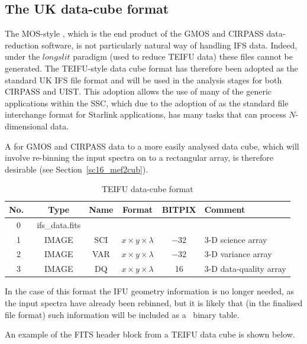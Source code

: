 \documentclass[twoside,11pt]{starlink}
\providecommand{\FITSref}{\htmladdnormallink{FITS}{http://fits.gsfc.nasa.gov/}}
\begin{document}
\subsection{The UK data-cube format\label{sc16_teifufile}}

The MOS-style , which is the end
product of the GMOS and CIRPASS data-reduction software, is not
particularly natural way of handling IFS data.  Indeed, under the
$longslit$ paradigm (used to reduce TEIFU data) these files cannot be
generated.  The TEIFU-style data cube format has therefore been
adopted as the standard UK IFS file format and will be used in the
analysis stages for both CIRPASS and UIST.  This adoption allows the
use of many of the generic applications within the SSC, which due to
the adoption of  as the standard file interchange
format for Starlink applications, has many tasks that can process
$N$-dimensional data.

A  for GMOS and CIRPASS data
to a more easily analysed data cube, which will involve re-binning the
input spectra on to a rectangular array, is therefore
desirable (see Section~\ref{sc16_mef2cub}).

\begin{table}[h]
\begin{center}
\begin{tabular}{cccccl}
No.\ & Type  & Name & Format & BITPIX & Comment\\\hline
0 &ifs\_data.fits &  &          &       & \\
1 & IMAGE & SCI & $x \times y\times \lambda$ & $-$32 & 3-D science array \\
2 & IMAGE & VAR & $x \times y\times \lambda$ & $-$32 & 3-D variance array \\
3 & IMAGE & DQ  & $x \times y\times \lambda$ &    16 & 3-D data-quality array \\ \hline
\end{tabular}
\caption{TEIFU data-cube format}
\end{center}
\protect\label{tab:cub_file}
\end{table}

In the case of this format the IFU geometry information is no longer
needed, as the input spectra have already been rebinned, but it is
likely that (in the finalised file format) such information will be
included as a \FITSref\  binary table.

An example of the FITS header block from a TEIFU data cube is shown below.
\end{document}
